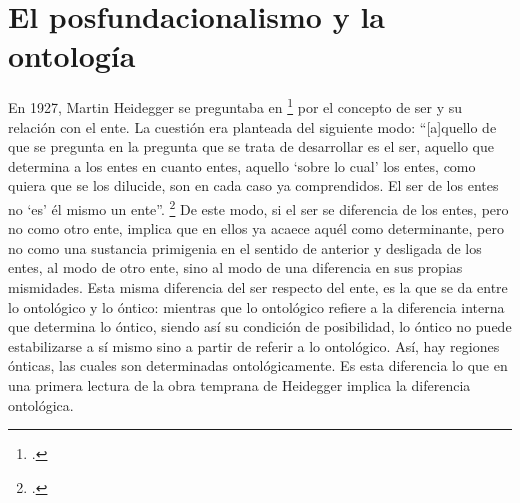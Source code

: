 \section{El posfundacionalismo y la ontología} %

En 1927, Martin Heidegger se preguntaba en \footcite{@7095-HEIDEGGER2009} por el concepto de ser y su relación con el ente. La cuestión era planteada del siguiente modo: \enquote{{[}a{]}quello de que se pregunta en la pregunta que se trata de desarrollar es el ser, aquello que determina a los entes en cuanto entes, aquello \enquote{sobre lo cual} los entes, como quiera que se los dilucide, son en cada caso ya comprendidos. El ser de los entes no \enquote{es} él mismo un ente}. \footcite[15--16]{@7095-HEIDEGGER2009} De este modo, si el ser se diferencia de los entes, pero no como otro ente, implica que en ellos ya acaece aquél como determinante, pero no como una sustancia primigenia en el sentido de anterior y desligada de los entes, al modo de otro ente, sino al modo de una diferencia en sus propias mismidades. Esta misma diferencia del ser respecto del ente, es la que se da entre lo ontológico y lo óntico: mientras que lo ontológico refiere a la diferencia interna que determina lo óntico, siendo así su condición de posibilidad, lo óntico no puede estabilizarse a sí mismo sino a partir de referir a lo ontológico. Así, hay regiones ónticas, las cuales son determinadas ontológicamente. Es esta diferencia lo que en una primera lectura de la obra temprana de Heidegger implica la diferencia ontológica.

